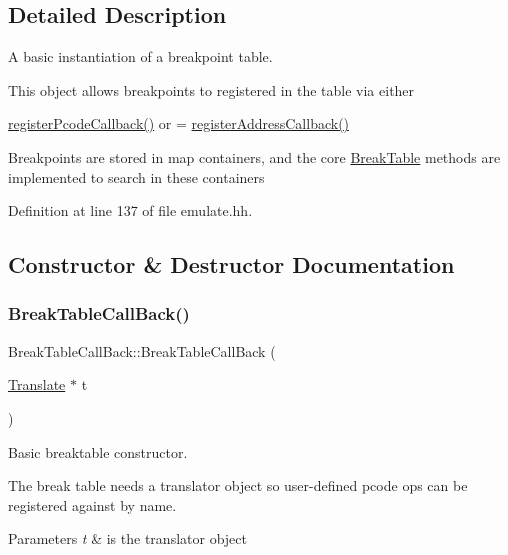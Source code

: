 \subsection{Detailed Description}
A basic instantiation of a breakpoint table. 

This object allows breakpoints to registered in the table via either
\begin{DoxyItemize}
\item \mbox{\hyperlink{class_break_table_call_back_a7c2ea1b2996ea556188e1c09a8f6ec1f}{register\+Pcode\+Callback()}} or = \mbox{\hyperlink{class_break_table_call_back_a22f1cb661549be082a71edcca5eb7f5f}{register\+Address\+Callback()}}
\end{DoxyItemize}

Breakpoints are stored in map containers, and the core \mbox{\hyperlink{class_break_table}{Break\+Table}} methods are implemented to search in these containers 

Definition at line 137 of file emulate.\+hh.



\subsection{Constructor \& Destructor Documentation}
\mbox{\label{class_break_table_call_back_ada0c6a6ba41fe406768cb37cee7daaa2}} 
\subsubsection{\texorpdfstring{BreakTableCallBack()}{BreakTableCallBack()}}
{\footnotesize\ttfamily Break\+Table\+Call\+Back\+::\+Break\+Table\+Call\+Back (\begin{DoxyParamCaption}\item[{\mbox{\hyperlink{class_translate}{Translate}} $\ast$}]{t }\end{DoxyParamCaption})\hspace{0.3cm}{\ttfamily [inline]}}



Basic breaktable constructor. 

The break table needs a translator object so user-\/defined pcode ops can be registered against by name. 
\begin{DoxyParams}{Parameters}
{\em t} & is the translator object \\
\hline
\end{DoxyParams}


